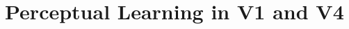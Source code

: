 \chapter{Perceptual Learning in {V1} and {V4}}

\graphicspath{{Chapters/perceptual-learning/}}






